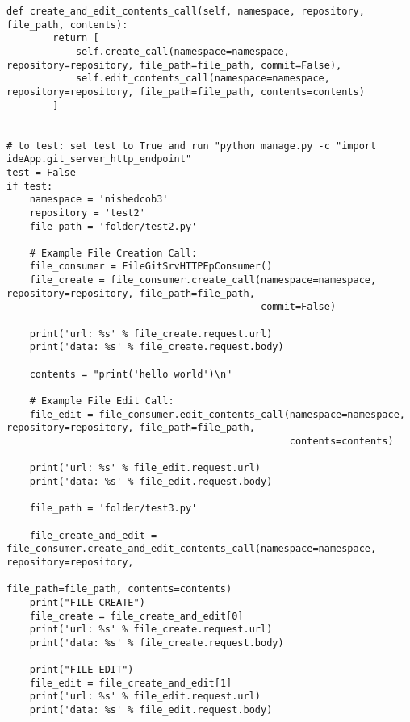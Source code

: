 \begin{lstlisting}[breaklines]
    def create_and_edit_contents_call(self, namespace, repository, file_path, contents):
        return [
            self.create_call(namespace=namespace, repository=repository, file_path=file_path, commit=False),
            self.edit_contents_call(namespace=namespace, repository=repository, file_path=file_path, contents=contents)
        ]


# to test: set test to True and run "python manage.py -c "import ideApp.git_server_http_endpoint"
test = False
if test:
    namespace = 'nishedcob3'
    repository = 'test2'
    file_path = 'folder/test2.py'

    # Example File Creation Call:
    file_consumer = FileGitSrvHTTPEpConsumer()
    file_create = file_consumer.create_call(namespace=namespace, repository=repository, file_path=file_path,
                                            commit=False)

    print('url: %s' % file_create.request.url)
    print('data: %s' % file_create.request.body)

    contents = "print('hello world')\n"

    # Example File Edit Call:
    file_edit = file_consumer.edit_contents_call(namespace=namespace, repository=repository, file_path=file_path,
                                                 contents=contents)

    print('url: %s' % file_edit.request.url)
    print('data: %s' % file_edit.request.body)

    file_path = 'folder/test3.py'

    file_create_and_edit = file_consumer.create_and_edit_contents_call(namespace=namespace, repository=repository,
                                                                       file_path=file_path, contents=contents)
    print("FILE CREATE")
    file_create = file_create_and_edit[0]
    print('url: %s' % file_create.request.url)
    print('data: %s' % file_create.request.body)

    print("FILE EDIT")
    file_edit = file_create_and_edit[1]
    print('url: %s' % file_edit.request.url)
    print('data: %s' % file_edit.request.body)
\end{lstlisting}
\lstset{language=Bash}

